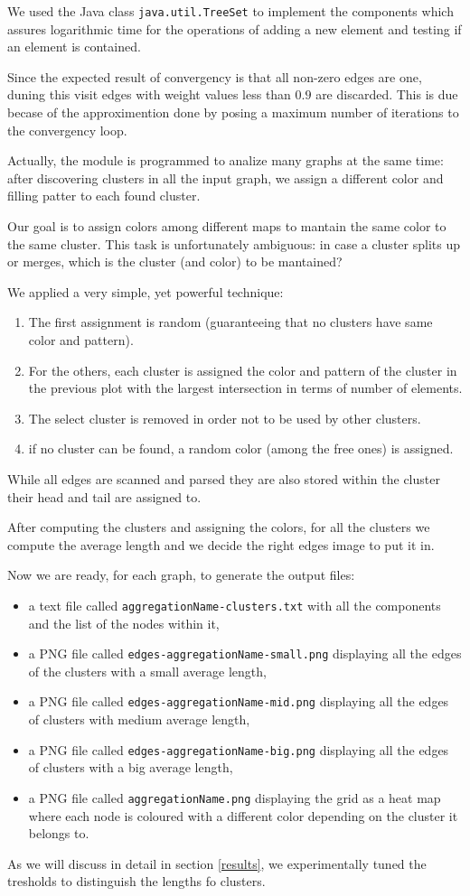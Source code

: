 We used the Java class \verb!java.util.TreeSet! to implement
the components which assures logarithmic time for
the operations of adding a new element and testing if an element
is contained. 

Since the expected result of convergency is that all non-zero edges
are one, duning this visit edges with weight values less than $0.9$
are discarded. This is due becase of the approximention done by
posing a maximum number of iterations to the convergency loop.

Actually, the module is programmed to analize many graphs at the same
time:
after discovering clusters in all the input graph, we assign
a different color and filling patter to each found cluster.

Our goal is to assign colors among different maps to mantain
the same color to the same cluster. This task is unfortunately
ambiguous: in case a cluster splits up or merges, which is the cluster
(and color) to be mantained?

We applied a very simple, yet powerful technique: 
\begin{enumerate}
\item The first assignment is random (guaranteeing  
that no clusters have same color and pattern).
\item For the others, each cluster is assigned the color and
pattern of the cluster in the previous plot with
the largest intersection in terms of number of elements.
\item The select cluster is removed in order not to be used
by other clusters.
\item if no cluster can be found, a random color (among the free ones)
is assigned.
\end{enumerate}

While all edges are scanned and parsed they are also stored
within the cluster their head and tail are assigned to.

After computing the clusters and assigning the colors,
for all the clusters we compute the average length and we
decide the right edges image to put it in.

Now we are ready, for each graph, to generate the output files:
\begin{itemize}
\item a text file called \verb!aggregationName-clusters.txt! with all the components and
the list of the nodes within it,
\item a PNG file called \verb!edges-aggregationName-small.png! displaying all the edges of
the clusters with a small average length,
\item a PNG file called \verb!edges-aggregationName-mid.png! displaying all the edges 
of clusters with medium average length,
\item a PNG file called \verb!edges-aggregationName-big.png! displaying all the edges
of clusters with a big average length,
\item a PNG file called \verb!aggregationName.png! displaying the grid  as a 
heat map where
each node is coloured with a different color depending on the cluster it
belongs to.
\end{itemize}

As we will discuss in detail in section \ref{results}, we experimentally tuned the tresholds to distinguish the lengths fo clusters.